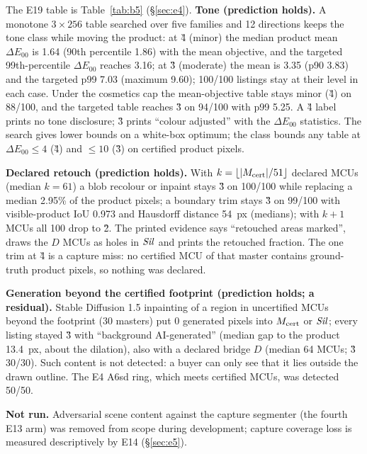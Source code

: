 \documentclass[10pt]{article}
\begin{document}
The E19 table is Table~\ref{tab:b5} (\S\ref{sec:e4}).
\textbf{Tone (prediction holds).} A monotone $3\times256$ table searched over five families and 12 directions keeps
the tone class while moving the product: at \G{4} (minor) the median product mean $\Delta E_{00}$ is 1.64 (90th
percentile 1.86) with the mean objective, and the targeted 99th-percentile $\Delta E_{00}$ reaches 3.16; at \G{3}
(moderate) the mean is 3.35 (p90 3.83) and the targeted p99 7.03 (maximum 9.60); 100/100 listings stay at their level in
each case. Under the cosmetics cap the mean-objective table stays minor (\G{4}) on 88/100, and the targeted table
reaches \G{3} on 94/100 with p99 5.25. A \G{4} label prints no tone disclosure; \G{3} prints ``colour adjusted'' with
the $\Delta E_{00}$ statistics. The search gives lower bounds on a white-box optimum; the class bounds any table at
$\Delta E_{00}\le4$ (\G{4}) and $\le10$ (\G{3}) on certified product pixels.

\textbf{Declared retouch (prediction holds).} With $k=\lfloor|M_{\mathrm{cert}}|/51\rfloor$ declared MCUs (median $k=61$) a blob
recolour or inpaint stays \G{3} on 100/100 while replacing a median 2.95\% of the product pixels; a boundary trim stays
\G{3} on 99/100 with visible-product IoU 0.973 and Hausdorff distance 54~px (medians); with $k+1$ MCUs all 100 drop to
\G{2}. The printed evidence says ``retouched areas marked'', draws the $D$ MCUs as holes in $\mathit{Sil}$ and prints the
retouched fraction. The one trim at \G{4} is a capture miss: no certified MCU of that master contains ground-truth
product pixels, so nothing was declared.

\textbf{Generation beyond the certified footprint (prediction holds; a residual).} Stable Diffusion 1.5 inpainting of
a region in uncertified MCUs beyond the footprint (30 masters) put 0 generated pixels into $M_{\mathrm{cert}}$ or $\mathit{Sil}$; every
listing stayed \G{3} with ``background AI-generated'' (median gap to the product 13.4~px, about the dilation), also
with a declared bridge $D$ (median 64 MCUs; \G{3} 30/30). Such content is not detected: a buyer can only see that it
lies outside the drawn outline. The E4 A6sd ring, which meets certified MCUs, was detected 50/50.

\textbf{Not run.} Adversarial scene content against the capture segmenter (the fourth E13 arm) was removed from scope
during development; capture coverage loss is measured descriptively by E14 (\S\ref{sec:e5}).
\end{document}

